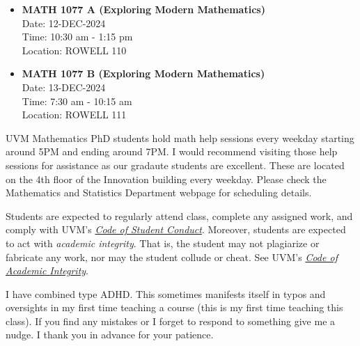 \documentclass[11pt, letterpaper]{article}
\theoremstyle{definition}
\theoremstyle{remark}
\begin{document}
\begin{itemize}

\item	\textbf{MATH 1077 A (Exploring Modern Mathematics)} \\
	Date: 12-DEC-2024 \\
	Time: 10:30 am - 1:15 pm \\
	Location: ROWELL 110 \\
	
	\item \textbf{MATH 1077 B (Exploring Modern Mathematics)} \\
	Date: 13-DEC-2024 \\
	Time: 7:30 am - 10:15 am \\
	Location: ROWELL 111 \\
\end{itemize}
\vspace{1em}

UVM Mathematics PhD students hold math help sessions every weekday starting around 5PM and ending around 7PM. 
I would recommend visiting those help sessions for assistance as our gradaute students are excellent.
These are located on the 4th floor of the Innovation building every weekday. Please check the Mathematics and Statistics Department webpage for scheduling details. 

\vspace{1em}

 Students are expected to regularly attend class, complete any assigned work, and comply with UVM's \href{http://www.uvm.edu/policies/student/studentcode.pdf}{{\em Code of Student Conduct}}.
Moreover, students are expected to act with {\em academic integrity}. That is, the student may not plagiarize or fabricate any work, nor may the student collude or cheat. See UVM's \href{https://www.uvm.edu/policies/student/acadintegrity.pdf}{{\em Code of Academic Integrity}}.
\vspace{1em}

 I have combined type ADHD. 
This sometimes manifests itself in typos and oversights in my first time teaching a course (this is my first time teaching this class). 
If you find any mistakes or I forget to respond to something give me a nudge.
I thank you in advance for your patience.
\end{document}
